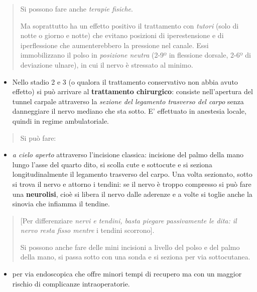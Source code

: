 \documentclass[]{article}
\begin{document}
\begin{quote}
Si possono fare anche \emph{terapie fisiche}.

Ma soprattutto ha un effetto positivo il trattamento con \emph{tutori}
(solo di notte o giorno e notte) che evitano posizioni di iperestensione
e di iperflessione che aumenterebbero la pressione nel canale. Essi
immobilizzano il polso in \emph{posizione neutra} (2-9º in flessione
dorsale, 2-6º di deviazione ulnare), in cui il nervo è stressato al
minimo.
\end{quote}

\begin{itemize}
\item
  Nello stadio 2 e 3 (o qualora il trattamento conservativo non abbia
  avuto effetto) si può arrivare al \textbf{trattamento chirurgico}:
  consiste nell'apertura del tunnel carpale attraverso la \emph{sezione
  del legamento trasverso del carpo} senza danneggiare il nervo mediano
  che sta sotto. E' effettuato in anestesia locale, quindi in regime
  ambulatoriale.
\end{itemize}

\begin{quote}
Si può fare:
\end{quote}

\begin{itemize}
\item
  \emph{a cielo aperto} attraverso l'incisione classica: incisione del
  palmo della mano lungo l'asse del quarto dito, si scolla cute e
  sottocute e si seziona longitudinalmente il legamento trasverso del
  carpo. Una volta sezionato, sotto si trova il nervo e attorno i
  tendini: se il nervo è troppo compresso si può fare una
  \textbf{neurolisi}, cioè si libera il nervo dalle aderenze e a volte
  si toglie anche la sinovia che infiamma il tendine.
\end{itemize}

\begin{quote}
{[}Per differenziare \emph{nervi e tendini, basta piegare passivamente
le dita: il nervo resta fisso mentre} i tendini scorrono{]}.

Si possono anche fare delle mini incisioni a livello del polso e del
palmo della mano, si passa sotto con una sonda e si seziona per via
sottocutanea.
\end{quote}

\begin{itemize}
\item
  per via endoscopica che offre minori tempi di recupero ma con un
  maggior rischio di complicanze intraoperatorie.
\end{itemize}
\end{document}
